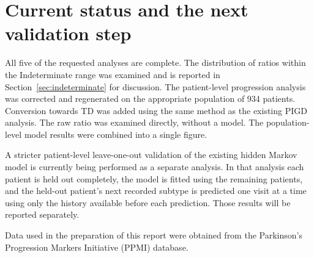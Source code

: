 \documentclass[11pt,a4paper]{article}
\begin{document}
\section{Current status and the next validation step}

All five of the requested analyses are complete. The distribution of ratios
within the Indeterminate range was examined and is reported in
Section~\ref{sec:indeterminate} for discussion. The patient-level progression
analysis was
corrected and regenerated on the appropriate population of 934 patients.
Conversion towards TD was added using the same method as the existing PIGD
analysis. The raw ratio was examined directly, without a model. The
population-level model results were combined into a single figure.

A stricter patient-level leave-one-out validation of the existing hidden Markov
model is currently being performed as a separate analysis. In that analysis each
patient is held out completely, the model is fitted using the remaining patients,
and the held-out patient's next recorded subtype is predicted one visit at a time
using only the history available before each prediction. Those results will be
reported separately.

\vspace{1em}
\noindent
\small
Data used in the preparation of this report were obtained from the Parkinson's
Progression Markers Initiative (PPMI) database.
\end{document}
